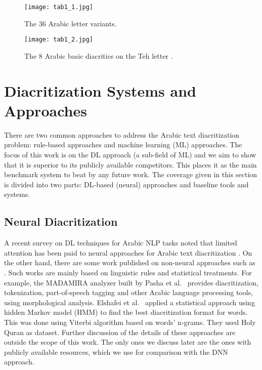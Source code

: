 \documentclass[conference]{IEEEtran}
\begin{document}
\begin{figure}
    \centering
    \texttt{[image: tab1\_1.jpg]}
    \caption{The 36 Arabic letter variants.}
    \label{tab1_1}
\end{figure}

\begin{figure}
    \centering
    \texttt{[image: tab1\_2.jpg]}
    \caption{The 8 Arabic basic diacritics on the Teh letter \cite{abandah2015automatic}.}
    \label{tab1_2}
\end{figure}

\section{Diacritization Systems and Approaches}
\label{sec:related}

There are two common approaches to address the Arabic text diacritization problem: rule-based approaches and machine learning (ML) approaches. The focus of this work is on the DL approach (a sub-field of ML) and we aim to show that it is superior to its publicly available competitors. This places it as the main benchmark system to beat by any future work.
The coverage given in this section is divided into two parts: DL-based (neural) approaches and baseline tools and systems.

\subsection{Neural Diacritization}

A recent survey on DL techniques for Arabic NLP tasks noted that limited attention has been paid to neural approaches for Arabic text diacritization \cite{dl4anlp}. On the other hand, there are some work published on non-neural approaches such as \cite{zitouni2009arabic,pasha2014madamira,shahrour2015improving,alnefaie2017automatic,bebah2014hybrid,chennoufi2017morphological,darwish2017arabic,fashwan2017shakkil,azmi2015survey}.
Such works are mainly based on linguistic rules and statistical treatments. For example, the MADAMIRA analyzer built by Pasha et al.~\cite{pasha2014madamira} provides diacritization, tokenization, part-of-speech tagging and other Arabic language processing tools, using morphological analysis.
Elshafei et al.~\cite{elshafei2006statistical} applied a statistical approach using hidden Markov model (HMM) to find the best diacritization format for words. This was done using Viterbi algorithm based on words' n-grams. They used Holy Quran as dataset.
Further discussion of the details of these approaches are outside the scope of this work. The only ones we discuss later are the ones with publicly available resources, which we use for comparison with the DNN approach.
\end{document}
